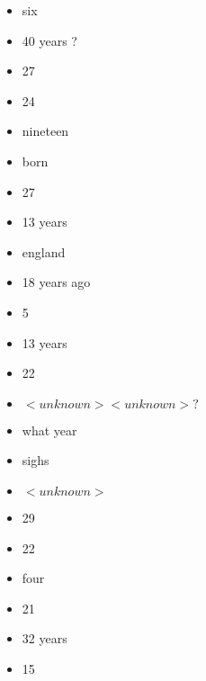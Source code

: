 \begin{multicols}{2}
\begin{itemize}
		\item six
		\item 40 years ?
		\item 27
		\item 24
		\item nineteen
		\item born
		\item 27
		\item 13 years
		\item england
		\item 18 years ago
		\item 5
		\item 13 years
		\item 22
		\item $<unknown> <unknown> ?$
		\item what year
		\item sighs
		\item $<unknown>$
		\item 29
		\item 22
		\item four
		\item 21
		\item 32 years
		\item 15
	\end{itemize}
\end{multicols}

